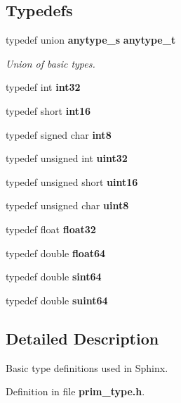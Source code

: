\subsection*{Typedefs}
\begin{DoxyCompactItemize}
\item 
typedef union {\bf anytype\-\_\-s} {\bf anytype\-\_\-t}\label{prim__type_8h_a98bfefef272895ed1506502cdb8c1aa3}

\begin{DoxyCompactList}\small\item\em Union of basic types. \end{DoxyCompactList}\item 
typedef int {\bfseries int32}\label{prim__type_8h_a56f1a81c92849566ae864511088eb7e8}

\item 
typedef short {\bfseries int16}\label{prim__type_8h_a4355d16fcf9f644c9ac84293f0b1801f}

\item 
typedef signed char {\bfseries int8}\label{prim__type_8h_a1b956fe1df85f3c132b21edb4e116458}

\item 
typedef unsigned int {\bfseries uint32}\label{prim__type_8h_a1134b580f8da4de94ca6b1de4d37975e}

\item 
typedef unsigned short {\bfseries uint16}\label{prim__type_8h_a05f6b0ae8f6a6e135b0e290c25fe0e4e}

\item 
typedef unsigned char {\bfseries uint8}\label{prim__type_8h_adde6aaee8457bee49c2a92621fe22b79}

\item 
typedef float {\bfseries float32}\label{prim__type_8h_aacdc525d6f7bddb3ae95d5c311bd06a1}

\item 
typedef double {\bfseries float64}\label{prim__type_8h_a232fad1b0d6dcc7c16aabde98b2e2a80}

\item 
typedef double {\bfseries sint64}\label{prim__type_8h_aadeb404e0ead4751116cc2d740291ddb}

\item 
typedef double {\bfseries suint64}\label{prim__type_8h_ae5db8415cb7961a98a06bab1c756230e}

\end{DoxyCompactItemize}


\subsection{Detailed Description}
Basic type definitions used in Sphinx. 

Definition in file {\bf prim\-\_\-type.\-h}.

